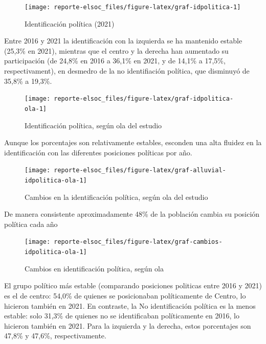 \documentclass[
  12pt,
]{book}
\begin{document}
\begin{figure}

{\centering \texttt{[image: reporte-elsoc\_files/figure-latex/graf-idpolitica-1]} 

}

\caption{Identificación política (2021)}\label{fig:graf-idpolitica}
\end{figure}

Entre 2016 y 2021 la identificación con la izquierda se ha mantenido estable (25,3\% en 2021), mientras que
el centro y la derecha han aumentado su participación (de 24,8\% en 2016 a 36,1\% en 2021, y de 14,1\% a 17,5\%, respectivament), en desmedro de la no identifiación política, que disminuyó de 35,8\% a 19,3\%.

\begin{figure}

{\centering \texttt{[image: reporte-elsoc\_files/figure-latex/graf-idpolitica-ola-1]} 

}

\caption{Identificación política, según ola del estudio}\label{fig:graf-idpolitica-ola}
\end{figure}

Aunque los porcentajes son relativamente estables, esconden una alta fluidez en la identificación con las diferentes posiciones políticas por año.

\begin{figure}

{\centering \texttt{[image: reporte-elsoc\_files/figure-latex/graf-alluvial-idpolitica-ola-1]} 

}

\caption{Cambios en la identificación política, según ola del estudio}\label{fig:graf-alluvial-idpolitica-ola}
\end{figure}

De manera consistente aproximadamente 48\% de la población cambia su posición política cada año

\begin{figure}

{\centering \texttt{[image: reporte-elsoc\_files/figure-latex/graf-cambios-idpolitica-ola-1]} 

}

\caption{Cambios en identificación política, según ola}\label{fig:graf-cambios-idpolitica-ola}
\end{figure}

El grupo político más estable (comparando posiciones politicas entre 2016 y 2021) es el de centro: 54,0\% de quienes se posicionaban políticamente de Centro, lo hicieron también en 2021. En contraste, la No identificación política es la menos estable: solo 31,3\% de quienes no se identificaban políticamente en 2016, lo hicieron también en 2021. Para la izquierda y la derecha, estos porcentajes son 47,8\% y 47,6\%, respectivamente.
\end{document}
